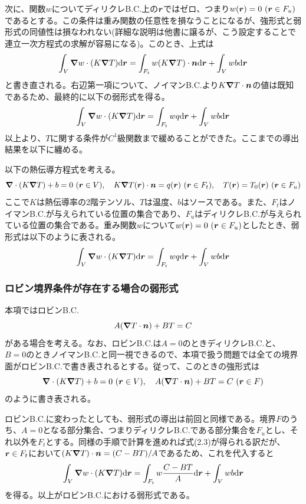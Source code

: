 \documentclass[dvipdfmx, 9pt, a4paper]{jsarticle}
\numberwithin{equation}{section}
\newcommand{\bm}[1]{{\mbox{\boldmath $#1$}}}
\newcommand{\bnabla}{\bm \nabla}
\begin{document}
次に、関数$w$についてディリクレB.C.上の$\bm r$ではゼロ、つまり$w(\bm r)=0~(\bm r \in F_u)$であるとする。この条件は重み関数の任意性を損なうことになるが、強形式と弱形式の同値性は損なわれない(詳細な説明は他書に譲るが、こう設定することで連立一次方程式の求解が容易になる)。このとき、上式は
\begin{equation}
\int_V\bnabla w \cdot (K\bnabla T) {\rm d} \bm r = 
\int_{F_t}w(K\bnabla T)\cdot \bm n{\rm d} \bm r + \int_Vwb{\rm d}\bm r
\end{equation}
と書き直される。右辺第一項について、ノイマンB.C.より$K\bnabla T\cdot \bm n$の値は既知であるため、最終的に以下の弱形式を得る。
\begin{equation}
\int_V\bnabla w \cdot (K\bnabla T) {\rm d} \bm r = 
\int_{F_t}wq{\rm d} \bm r + \int_Vwb{\rm d}\bm r \notag
\end{equation}
以上より、$T$に関する条件が$C^1$級関数まで緩めることができた。ここまでの導出結果を以下に纏める。
\begin{tcolorbox}[title=定常熱伝導問題における弱形式]
以下の熱伝導方程式を考える。
\begin{equation}
\bnabla \cdot (K\bnabla T)+b=0~(\bm r \in V),~~~K\bnabla T(\bm r)\cdot \bm n =q(\bm r)~(\bm r \in F_t),~~~T(\bm r)=T_0(\bm r)~(\bm r \in F_u)
\end{equation}
ここで$K$は熱伝導率の2階テンソル、$T$は温度、$b$はソースである。また、$F_t$はノイマンB.C.が与えられている位置の集合であり、$F_u$はディリクレB.C.が与えられている位置の集合である。重み関数$w$について$w(\bm r)=0~(\bm r \in F_u)$としたとき、弱形式は以下のように表される。
\begin{equation}
\int_V\bnabla w \cdot (K\bnabla T) {\rm d} \bm r = 
\int_{F_t}wq{\rm d} \bm r + \int_Vwb{\rm d}\bm r
\end{equation}
\end{tcolorbox}

\subsubsection{ロビン境界条件が存在する場合の弱形式}
本項ではロビンB.C.
\begin{equation}
A(\bnabla T \cdot \bm n) + BT=C \notag
\end{equation}
がある場合を考える。なお、ロビンB.C.は$A=0$のときディリクレB.C.と、$B=0$のときノイマンB.C.と同一視できるので、本項で扱う問題では全ての境界面がロビンB.C.で書き表されるとする。従って、このときの強形式は
\begin{equation}
\bnabla \cdot (K\bnabla T)+b=0~(\bm r \in V),~~~A(\bnabla T \cdot \bm n) + BT=C~(\bm r \in F)
\end{equation}
のように書き表される。\par
ロビンB.C.に変わったとしても、弱形式の導出は前回と同様である。境界$F$のうち、$A=0$となる部分集合、つまりディリクレB.C.である部分集合を$F_u$とし、それ以外を$F_t$とする。同様の手順で計算を進めれば式(2.3)が得られる訳だが、$\bm r \in F_t$において$(K\bnabla T)\cdot \bm n=(C-BT)/A$であるため、これを代入すると
\begin{equation}
\int_V\bnabla w \cdot (K\bnabla T) {\rm d} \bm r = 
\int_{F_t}w\frac{C-BT}{A}{\rm d} \bm r + \int_Vwb{\rm d}\bm r
\end{equation}
を得る。以上がロビンB.C.における弱形式である。
\end{document}
